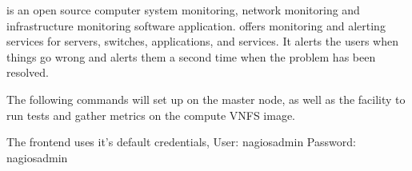 \Nagios{} is an open source computer system monitoring, network monitoring and
infrastructure monitoring software application. \Nagios{} offers monitoring and
alerting services for servers, switches, applications, and services. It alerts
the users when things go wrong and alerts them a second time when the problem
has been resolved.

The following commands will set up \Nagios{} on the master node, as well as the
facility to run tests and gather metrics on the compute VNFS image.

The \Nagios{} frontend uses it's default credentials, User: nagiosadmin
Password: nagiosadmin
